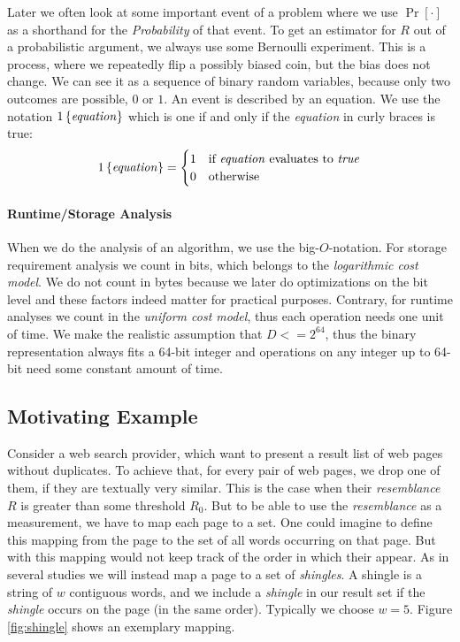 \documentclass[a4paper]{article}
\begin{document}
Later we often look at some important event of a problem where we use $\Pr[\cdot]$ as a shorthand for the \emph{Probability} of that event. To get an estimator for $R$ out of a probabilistic argument, we always use some Bernoulli experiment. This is a process, where we repeatedly flip a possibly biased coin, but the bias does not change. We can see it as a sequence of binary random variables, because only two outcomes are possible, $0$ or $1$. An event is described by an equation. We use the notation $1\left\lbrace \text{\textit{equation}} \right\rbrace$ which is one if and only if the \textit{equation} in curly braces is true:
\begin{equation*}
1\left\lbrace \text{\textit{equation}} \right\rbrace =\begin{cases}
    1 & \text{if \textit{equation} evaluates to \textit{true}} \\
    0 & \text{otherwise}
\end{cases}
\end{equation*}

\paragraph{Runtime/Storage Analysis}

When we do the analysis of an algorithm, we use the big-$O$-notation. For storage requirement analysis we count in bits, which belongs to the \textit{logarithmic cost model}. We do not count in bytes because we later do optimizations on the bit level and these factors indeed matter for practical purposes. Contrary, for runtime analyses we count in the \textit{uniform cost model}, thus each operation needs one unit of time. We make the realistic assumption that $D <= 2^{64}$, thus the binary representation always fits a 64-bit integer and operations on any integer up to 64-bit need some constant amount of time.

\subsection{Motivating Example}
Consider a web search provider, which want to present a result list of web pages without duplicates. To achieve that, for every pair of web pages, we drop one of them, if they are textually very similar. This is the case when their \emph{resemblance} $R$ is greater than some threshold $R_0$. But to be able to use the \emph{resemblance} as a measurement, we have to map each page to a set. One could imagine to define this mapping from the page to the set of all words occurring on that page. But with this mapping would not keep track of the order in which their appear. As in several studies \citep{Broder:1998,BroderGMZ97} we will instead map a page to a set of \emph{shingles}. A shingle is a string of $w$ contiguous words, and we include a \emph{shingle} in our result set if the \emph{shingle} occurs on the page (in the same order). Typically we choose $w = 5$. Figure \vref{fig:shingle} shows an exemplary mapping.
\end{document}
